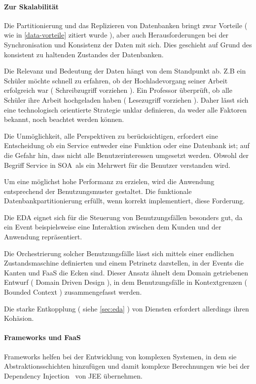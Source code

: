 \documentclass[
12pt,
english,
ngerman,
headsepline,
twoside,
openright,
numbers=noenddot,version=first
]{scrreprt}
\begin{document}
\paragraph{Zur Skalabilität}
Die Partitionierung und das Replizieren von Datenbanken bringt zwar Vorteile ( wie in \autoref{data-vorteile} zitiert wurde ), aber auch Herausforderungen bei der Synchronisation und Konsistenz der Daten mit sich. Dies geschieht auf Grund des konsistent zu haltenden Zustandes der Datenbanken.

Die Relevanz und Bedeutung der Daten hängt von dem Standpunkt ab. Z.B ein Schüler möchte schnell zu erfahren, ob der Hochladevorgang seiner Arbeit erfolgreich war ( Schreibzugriff vorziehen ). Ein Professor überprüft, ob alle Schüler ihre Arbeit hochgeladen haben ( Lesezugriff vorziehen ). Daher lässt sich eine technologisch orientierte Strategie unklar definieren, da weder alle Faktoren bekannt, noch beachtet werden können. 


Die Unmöglichkeit, alle Perspektiven zu berücksichtigen, erfordert eine Entscheidung ob ein Service entweder eine Funktion oder eine Datenbank ist; auf die Gefahr hin, dass nicht alle Benutzerinteressen umgesetzt werden. Obwohl der Begriff Service in \glqq \acrlong{SOA}\grqq\ als ein Mehrwert für die Benutzer verstanden wird. 

Um eine möglichst hohe Performanz zu erzielen, wird die Anwendung entsprechend der Benutzungsmuster gestaltet. Die funktionale Datenbankpartitionierung erfüllt, wenn korrekt implementiert, diese Forderung.


Die \acrshort{EDA} eignet sich für die Steuerung von Benutzungsfällen besonders gut, da ein Event beispielsweise eine Interaktion zwischen dem Kunden und der Anwendung repräsentiert. 

Die Orchestrierung solcher Benutzungsfälle lässt sich mittels einer endlichen Zustandsmaschine definierten und einem Petrinetz darstellen, in der Events die Kanten und \acrshort{FaaS} die Ecken sind. Dieser Ansatz ähnelt dem Domain getriebenen Entwurf ( Domain Driven Design \cite{ddd} ), in dem Benutzungsfälle in Kontextgrenzen ( Bounded Context ) zusammengefasst werden.

Die starke Entkopplung ( siehe \autoref{sec:eda} ) von Diensten erfordert allerdings ihren Kohäsion.


\paragraph{Frameworks und FaaS}
Frameworks helfen bei der Entwicklung von komplexen Systemen, in dem sie Abstraktionsschichten hinzufügen und damit komplexe Berechnungen wie bei der \glqq Dependency Injection \grqq\ von \acrfull{JEE} übernehmen. 
\end{document}
